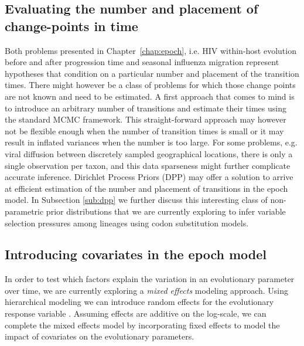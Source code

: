 \subsection{Evaluating the number and placement of change-points in time}

Both problems presented in Chapter~\ref{chap:epoch}, i.e. HIV within-host evolution before and after progression time and seasonal influenza migration represent hypotheses that condition on a particular number and placement of the transition times.
There might however be a class of problems for which those change points are not known and need to be estimated.
A first approach that comes to mind is to introduce an arbitrary number of transitions and estimate their times using the standard MCMC framework.
This straight-forward approach may however not be flexible enough when the number of transition times is small or it may result in
inflated variances when the number is too large. For some problems, e.g. viral diffusion between discretely sampled geographical locations, there is only a single observation per taxon, and this data sparseness might further complicate accurate inference.
Dirichlet Process Priors (DPP) may offer a solution to arrive at efficient estimation of the number and placement of transitions in the epoch model. 
In Subsection \ref{sub:dpp} we further discuss this interesting class of non-parametric prior distributions that we are currently exploring to infer variable selection pressures among lineages using codon substitution models.

\subsection{Introducing covariates in the epoch model\label{sub:glm_epoch}}

In order to test which factors explain the variation in an evolutionary parameter over time, we are currently exploring a \emph{mixed effects} modeling approach. 
Using hierarchical modeling we can introduce random effects for the evolutionary response variable \citep{Edo-Matas2011}.
Assuming effects are additive on the log-scale, we can complete the mixed effects model by incorporating fixed effects to model the impact of covariates on the evolutionary parameters. 

